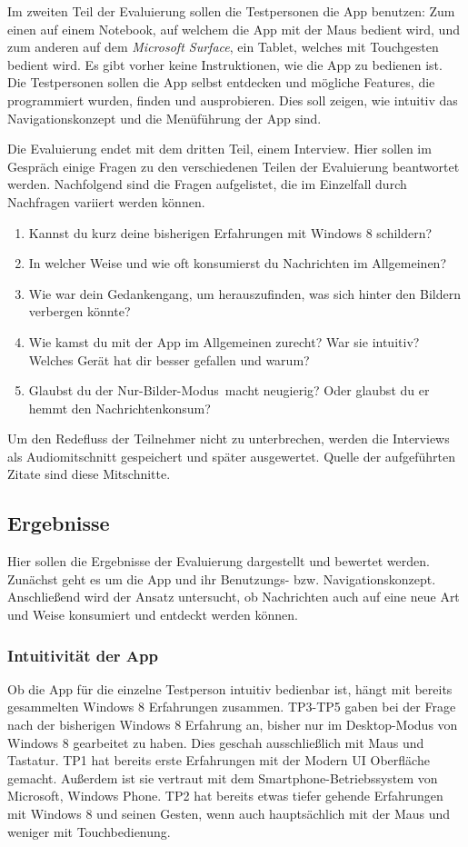 \documentclass[12pt,a4paper,bibtotoc,abstracton]{scrartcl}
\begin{document}
Im zweiten Teil der Evaluierung sollen die Testpersonen die App benutzen: Zum einen auf einem Notebook, auf welchem die App mit der Maus bedient wird, und zum anderen auf dem \textit{Microsoft Surface}, ein Tablet, welches mit Touchgesten bedient wird. Es gibt vorher keine Instruktionen, wie die App zu bedienen ist. Die Testpersonen sollen die App selbst entdecken und mögliche Features, die programmiert wurden, finden und ausprobieren. Dies soll zeigen, wie intuitiv das Navigationskonzept und die Menüführung der App sind.

Die Evaluierung endet mit dem dritten Teil, einem Interview. Hier sollen im Gespräch einige Fragen zu den verschiedenen Teilen der Evaluierung beantwortet werden. Nachfolgend sind die Fragen aufgelistet, die im Einzelfall durch Nachfragen variiert werden können.

\begin{enumerate}
	\item Kannst du kurz deine bisherigen Erfahrungen mit Windows 8 schildern?
	\item In welcher Weise und wie oft konsumierst du Nachrichten im Allgemeinen? 
	\item Wie war dein Gedankengang, um herauszufinden, was sich hinter den Bildern verbergen könnte?
	\item Wie kamst du mit der App im Allgemeinen zurecht? War sie intuitiv? Welches Gerät hat dir besser gefallen und warum?
	\item Glaubst du der \glqq Nur-Bilder-Modus\grqq\ macht neugierig? Oder glaubst du er hemmt den Nachrichtenkonsum? 
\end{enumerate}

Um den Redefluss der Teilnehmer nicht zu unterbrechen, werden die Interviews als Audiomitschnitt gespeichert und später ausgewertet. Quelle der aufgeführten Zitate sind diese Mitschnitte.

\subsection{Ergebnisse}
\label{subsec:ergebnisse}
Hier sollen die Ergebnisse der Evaluierung dargestellt und bewertet werden. Zunächst geht es um die App und ihr Benutzungs- bzw. Navigationskonzept. Anschließend wird der Ansatz untersucht, ob Nachrichten auch auf eine neue Art und Weise konsumiert und entdeckt werden können.

\subsubsection{Intuitivität der App} 
\label{subsubsec:intuitivitätderapp}
Ob die App für die einzelne Testperson intuitiv bedienbar ist, hängt mit bereits gesammelten Windows 8 Erfahrungen zusammen. TP3-TP5 gaben bei der Frage nach der bisherigen Windows 8 Erfahrung an, bisher nur im Desktop-Modus von Windows 8 gearbeitet zu haben. Dies geschah ausschließlich mit Maus und Tastatur. TP1 hat bereits erste Erfahrungen mit der Modern UI Oberfläche gemacht. Außerdem ist sie vertraut mit dem Smartphone-Betriebssystem von Microsoft, Windows Phone. TP2 hat bereits etwas tiefer gehende Erfahrungen mit Windows 8 und seinen Gesten, wenn auch hauptsächlich mit der Maus und weniger mit Touchbedienung.
\end{document}
